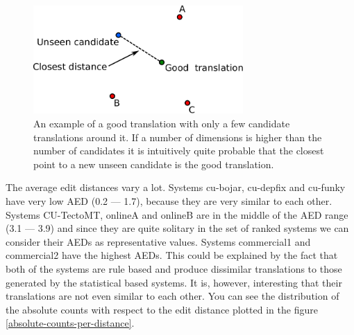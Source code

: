 \begin{figure}
    \begin{center}
        \includegraphics[width=8cm]{img/translation-space.pdf}
    \end{center}

    \caption[An illustration of a space of translations]{An example of a good
    translation with only a few candidate translations around it. If a number
  of dimensions is higher than the number of candidates it is intuitively quite
probable that the closest point to a new unseen candidate is the good
translation.}
    \label{translation-space-illustration}
\end{figure}

The average edit distances vary a lot. Systems cu-bojar, cu-depfix and cu-funky
have very low AED (0.2 --- 1.7), because they are very similar to each other.
Systems CU-TectoMT, onlineA and onlineB are in the middle of the AED range (3.1
--- 3.9) and since they are quite solitary in the set of ranked systems we can
consider their AEDs as representative values.  Systems commercial1 and
commercial2 have the highest AEDs. This could be explained by the fact that
both of the systems are rule based and produce dissimilar translations to those
generated by the statistical based systems. It is, however, interesting that
their translations are not even similar to each other. You can see the distribution of the absolute
counts with respect to the edit distance plotted in the figure
\ref{absolute-counts-per-distance}.

